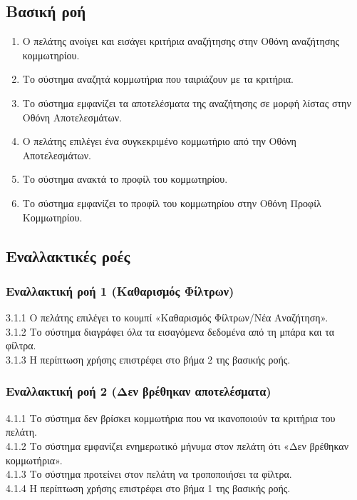 \documentclass[12pt,a4paper,twoside]{book}
\begin{document}
\subsection{Βασική ροή}
\begin{enumerate}
    \item Ο πελάτης ανοίγει και εισάγει κριτήρια αναζήτησης στην Οθόνη αναζήτησης κομμωτηρίου.
    \item Το σύστημα αναζητά κομμωτήρια που ταιριάζουν με τα κριτήρια.
    \item Το σύστημα εμφανίζει τα αποτελέσματα της αναζήτησης σε μορφή λίστας στην Οθόνη Αποτελεσμάτων.
    \item Ο πελάτης επιλέγει ένα συγκεκριμένο κομμωτήριο από την Οθόνη Αποτελεσμάτων.
    \item Το σύστημα ανακτά το προφίλ του κομμωτηρίου.
    \item Το σύστημα εμφανίζει το προφίλ του κομμωτηρίου στην Οθόνη Προφίλ Κομμωτηρίου.
\end{enumerate}

\subsection{Εναλλακτικές ροές}

\subsubsection*{Εναλλακτική ροή 1 (Καθαρισμός Φίλτρων)}
3.1.1 Ο πελάτης επιλέγει το κουμπί «Καθαρισμός Φίλτρων/Νέα Αναζήτηση».\\
\hspace*{\parindent}3.1.2 Το σύστημα διαγράφει όλα τα εισαγόμενα δεδομένα από τη μπάρα και τα φίλτρα.\\
\hspace*{\parindent}3.1.3 Η περίπτωση χρήσης επιστρέφει στο βήμα 2 της βασικής ροής.

\subsubsection*{Εναλλακτική ροή 2 (Δεν βρέθηκαν αποτελέσματα)}
4.1.1 Το σύστημα δεν βρίσκει κομμωτήρια που να ικανοποιούν τα κριτήρια του πελάτη.\\
\hspace*{\parindent}4.1.2 Το σύστημα εμφανίζει ενημερωτικό μήνυμα στον πελάτη ότι «Δεν βρέθηκαν κομμωτήρια».\\
\hspace*{\parindent}4.1.3 Το σύστημα προτείνει στον πελάτη να τροποποιήσει τα φίλτρα.\\
\hspace*{\parindent}4.1.4 Η περίπτωση χρήσης επιστρέφει στο βήμα 1 της βασικής ροής.
\end{document}
